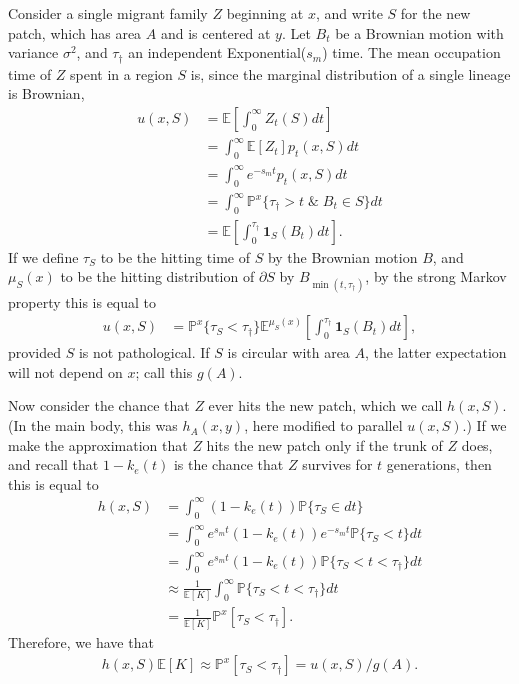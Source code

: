 \documentclass{article}
\renewcommand{\P}{\mathbb{P}}
\newcommand{\E}{\mathbb{E}}
\newcommand{\one}{\mathbf{1}}
\begin{document}
Consider a single migrant family $Z$ beginning at $x$,
and write $S$ for the new patch, which has area $A$ and is centered at $y$.
Let $B_t$ be a Brownian motion with variance $\sigma^2$, 
and $\tau_\dagger$ an independent Exponential($s_m$) time.
The mean occupation time of $Z$ spent in a region $S$ is,
since the marginal distribution of a single lineage is Brownian,
\begin{align}
    u(x,S) &= \E[\int_0^\infty Z_t(S) dt ] \\
           &= \int_0^\infty \E[Z_t] p_t(x,S) dt \\
        &= \int_0^\infty e^{-s_m t} p_t(x,S) dt \\
        &= \int_0^\infty \P^x\{ \tau_\dagger > t \; \& \; B_t \in S \} dt \\
        &= \E\left[ \int_0^{\tau_\dagger} \one_S(B_t) dt \right]  .
\end{align}
If we define
$\tau_S$ to be the hitting time of $S$ by the Brownian motion $B$,
and $\mu_S(x)$ to be the hitting distribution of $\partial S$ by $B_{\min(t,\tau_\dagger)}$,
by the strong Markov property this is equal to
\begin{align}
    u(x,S) %
           &= \P^x\{ \tau_S < \tau_\dagger \}  \E^{\mu_S(x)}\left[ \int_0^{\tau_\dagger} \one_S(B_t) dt \right] ,
\end{align}
provided $S$ is not pathological.
If $S$ is circular with area $A$, the latter expectation will not depend on $x$;
call this $g(A)$.

Now consider the chance that $Z$ ever hits the new patch, which we call $h(x,S)$.
(In the main body, this was $h_A(x,y)$, here modified to parallel $u(x,S)$.)
If we make the approximation that $Z$ hits the new patch only if the trunk of $Z$ does,
and recall that $1-k_e(t)$ is the chance that $Z$ survives for $t$ generations,
then this is equal to
\begin{align}
    h(x,S) &= \int_0^\infty (1-k_e(t)) \P\{ \tau_S \in dt \} \\
           &= \int_0^\infty e^{s_m t} (1-k_e(t)) e^{- s_m t } \P\{ \tau_S < t \} dt \\
    &=\int_0^\infty e^{s_m t} (1-k_e(t)) \P\{ \tau_S < t < \tau_\dagger \} dt \\
    &\approx \frac{1}{\E[K]} \int_0^\infty \P\{ \tau_S < t < \tau_\dagger \} dt \\
    &= \frac{1}{\E[K]} \P^x[ \tau_S < \tau_\dagger ] .
\end{align}
Therefore, we have that
\begin{align}
    h(x,S) \E[K] 
    \approx \P^x[ \tau_S < \tau_\dagger ] 
    = u(x,S) / g(A) .
\end{align}
\end{document}
